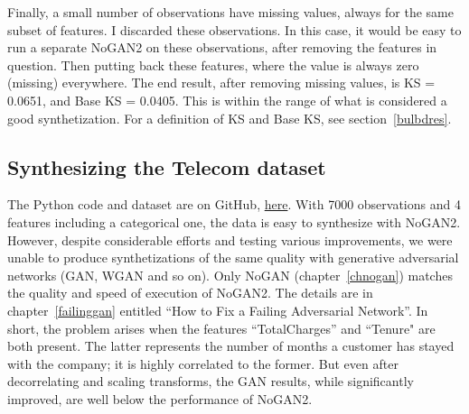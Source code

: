 \documentclass[oneside,10pt]{book}
\begin{document}
Finally, a small number of observations have missing values, always for the same subset of features. I discarded these observations. In this case,
 it would be easy to run a separate NoGAN2 on these observations, after removing the features in question. Then putting back these features,
 where the value is always zero (missing) everywhere. The end result, after removing missing values, is  KS = 0.0651, and
 Base KS = 0.0405. This is within the range of what is considered a good synthetization. For a definition of KS and Base KS, see
 section~\ref{bulbdres}.













\subsection{Synthesizing the Telecom dataset}\label{opbg30}

The Python code and dataset are on GitHub, \href{https://github.com/VincentGranville/Main/blob/main/DeepResampling_telecom.py}{here}.
With 7000 observations and 4 features including a categorical one, the data is easy to synthesize with NoGAN2. However, 
 despite considerable efforts and testing various improvements, we were unable to produce synthetizations of the same quality with
 generative adversarial networks (GAN, WGAN and so on).
 Only NoGAN (chapter~\ref{chnogan}) matches the quality and speed of execution of NoGAN2. The details are in chapter~\ref{failinggan} entitled ``How to Fix a 
 Failing Adversarial Network''. In short, the problem arises when the  features ``TotalCharges'' and ``Tenure" are
 both present.
 The latter represents the number of months
 a customer has stayed with the company; it is highly correlated to the former. But even after decorrelating and scaling transforms, the GAN results, while significantly improved,
 are well below the performance of NoGAN2.
\end{document}
